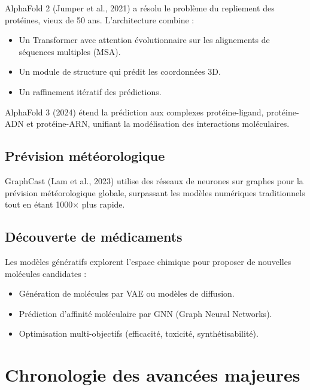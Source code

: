 AlphaFold 2 (Jumper et al., 2021) a r\'esolu le probl\`eme du repliement des prot\'eines, vieux de 50 ans. L'architecture combine :
\begin{itemize}
\item Un Transformer avec attention \'evolutionnaire sur les alignements de s\'equences multiples (MSA).
\item Un module de structure qui pr\'edit les coordonn\'ees 3D.
\item Un raffinement it\'eratif des pr\'edictions.
\end{itemize}

\begin{remarque}
AlphaFold 3 (2024) \'etend la pr\'ediction aux complexes prot\'eine-ligand, prot\'eine-ADN et prot\'eine-ARN, unifiant la mod\'elisation des interactions mol\'eculaires.
\end{remarque}

\subsection{Pr\'evision m\'et\'eorologique}

GraphCast (Lam et al., 2023) utilise des r\'eseaux de neurones sur graphes pour la pr\'evision m\'et\'eorologique globale, surpassant les mod\`eles num\'eriques traditionnels tout en \'etant 1000$\times$ plus rapide.

\subsection{D\'ecouverte de m\'edicaments}

Les mod\`eles g\'en\'eratifs explorent l'espace chimique pour proposer de nouvelles mol\'ecules candidates :
\begin{itemize}
\item G\'en\'eration de mol\'ecules par VAE ou mod\`eles de diffusion.
\item Pr\'ediction d'affinit\'e mol\'eculaire par GNN (Graph Neural Networks).
\item Optimisation multi-objectifs (efficacit\'e, toxicit\'e, synth\'etisabilit\'e).
\end{itemize}

\section{Chronologie des avanc\'ees majeures}

